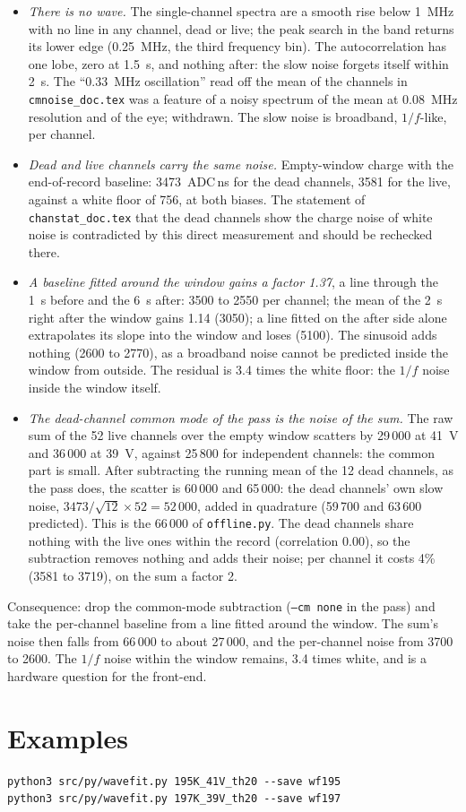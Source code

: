 \documentclass[11pt]{article}
\newcommand{\code}[1]{\texttt{#1}}
\newcommand{\us}{\textmu s}
\begin{document}
\begin{itemize}
\item \emph{There is no wave.} The single-channel spectra are a smooth
  rise below 1~MHz with no line in any channel, dead or live; the peak
  search in the band returns its lower edge (0.25~MHz, the third
  frequency bin). The autocorrelation has one lobe, zero at 1.5~\us, and
  nothing after: the slow noise forgets itself within 2~\us. The
  ``0.33~MHz oscillation'' read off the mean of the channels in
  \code{cmnoise\_doc.tex} was a feature of a noisy spectrum of the mean
  at 0.08~MHz resolution and of the eye; withdrawn. The slow noise is
  broadband, $1/f$-like, per channel.
\item \emph{Dead and live channels carry the same noise.} Empty-window
  charge with the end-of-record baseline: 3473~ADC\,ns for the dead
  channels, 3581 for the live, against a white floor of 756, at both
  biases. The statement of \code{chanstat\_doc.tex} that the dead channels
  show the charge noise of white noise is contradicted by this direct
  measurement and should be rechecked there.
\item \emph{A baseline fitted around the window gains a factor 1.37}, a
  line through the 1~\us{} before and the 6~\us{} after: 3500 to 2550 per
  channel; the mean of the 2~\us{} right after the window gains 1.14
  (3050); a line fitted on the after side alone extrapolates its slope
  into the window and loses (5100). The sinusoid adds nothing (2600 to
  2770), as a broadband noise cannot be predicted inside the window
  from outside. The residual is 3.4 times the white floor: the $1/f$
  noise inside the window itself.
\item \emph{The dead-channel common mode of the pass is the noise of
  the sum.} The raw sum of the 52 live channels over the empty window
  scatters by 29\,000 at 41~V and 36\,000 at 39~V, against 25\,800 for
  independent channels: the common part is small. After subtracting the
  running mean of the 12 dead channels, as the pass does, the scatter is
  60\,000 and 65\,000: the dead channels' own slow noise, $3473/\sqrt{12}
  \times 52 = 52\,000$, added in quadrature (59\,700 and 63\,600
  predicted). This is the 66\,000 of \code{offline.py}. The dead channels
  share nothing with the live ones within the record (correlation 0.00),
  so the subtraction removes nothing and adds their noise; per channel it
  costs 4\% (3581 to 3719), on the sum a factor 2.
\end{itemize}

Consequence: drop the common-mode subtraction (\code{--cm none} in the
pass) and take the per-channel baseline from a line fitted around the
window. The sum's noise then falls from 66\,000 to about 27\,000, and the
per-channel noise from 3700 to 2600. The $1/f$ noise within the window
remains, 3.4 times white, and is a hardware question for the front-end.

\section{Examples}

\begin{lstlisting}
python3 src/py/wavefit.py 195K_41V_th20 --save wf195
python3 src/py/wavefit.py 197K_39V_th20 --save wf197
\end{lstlisting}
\end{document}
